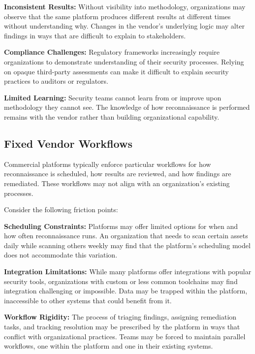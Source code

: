 \documentclass[a4paper,12pt]{report}
\begin{document}
\textbf{Inconsistent Results:} Without visibility into methodology, organizations may observe that the same platform produces different results at different times without understanding why. Changes in the vendor's underlying logic may alter findings in ways that are difficult to explain to stakeholders.\hfill \break

\textbf{Compliance Challenges:} Regulatory frameworks increasingly require organizations to demonstrate understanding of their security processes. Relying on opaque third-party assessments can make it difficult to explain security practices to auditors or regulators.\hfill \break

\textbf{Limited Learning:} Security teams cannot learn from or improve upon methodology they cannot see. The knowledge of how reconnaissance is performed remains with the vendor rather than building organizational capability.\hfill \break

\subsection{Fixed Vendor Workflows}

Commercial platforms typically enforce particular workflows for how reconnaissance is scheduled, how results are reviewed, and how findings are remediated. These workflows may not align with an organization's existing processes.\hfill \break

Consider the following friction points:\hfill \break

\textbf{Scheduling Constraints:} Platforms may offer limited options for when and how often reconnaissance runs. An organization that needs to scan certain assets daily while scanning others weekly may find that the platform's scheduling model does not accommodate this variation.\hfill \break

\textbf{Integration Limitations:} While many platforms offer integrations with popular security tools, organizations with custom or less common toolchains may find integration challenging or impossible. Data may be trapped within the platform, inaccessible to other systems that could benefit from it.\hfill \break

\textbf{Workflow Rigidity:} The process of triaging findings, assigning remediation tasks, and tracking resolution may be prescribed by the platform in ways that conflict with organizational practices. Teams may be forced to maintain parallel workflows, one within the platform and one in their existing systems.\hfill \break
\end{document}
